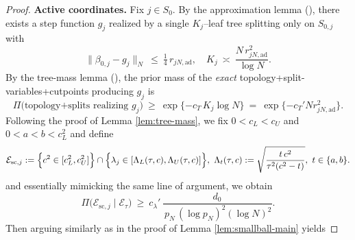\documentclass[11pt]{article}
\theoremstyle{plain}
\theoremstyle{definition}
\theoremstyle{plain}
\begin{document}
\begin{proof}
\medskip\noindent
\textbf{Active coordinates.}
Fix $j\in S_0$. By the approximation lemma (), there exists a step function $g_j$ realized by a single $K_j$–leaf tree splitting only on $S_{0,j}$ with
\begin{equation}\label{eq:approx-step}
\|\beta_{0,j}-g_j\|_N \ \le\ \tfrac14\,r_{jN,\mathrm{ad}},
\quad
K_j\ \asymp\ \frac{N\,r_{jN,\mathrm{ad}}^2}{\log N}.
\end{equation}
By the tree-mass lemma (), the prior mass of the \emph{exact} topology+split-variables+cutpoints producing $g_j$ is
\begin{equation}\label{eq:tree-mass}
\Pi\bigl(\text{topology+splits realizing }g_j\bigr)\ \ge\ \exp\{-c_T\,K_j\log N\}\ =\ \exp\{-c_T' N r_{jN,\mathrm{ad}}^2\}.
\end{equation}
Following the proof of Lemma \ref{lem:tree-mass}, we fix $0<c_L<c_U$ and $0<a<b<c_L^2$ and define
\[
\mathcal E_{\mathrm{sc},j}:=\Bigl\{c^2\in[c_L^2,c_U^2]\Bigr\}\cap \Bigl\{\lambda_j\in[\Lambda_L(\tau,c),\Lambda_U(\tau,c)]\Bigr\},
\
\Lambda_t(\tau,c):=\sqrt{\frac{t\,c^2}{\tau^2(c^2-t)}},\ t\in\{a,b\}.
\]
and essentially mimicking the same line of argument, we obtain
\begin{equation}\label{eq:calib-mass-dp-new}
\Pi\bigl(\mathcal E_{\mathrm{sc},j}\mid \mathcal E_\tau\bigr)
\ \ge\ c_\lambda'\,\frac{d_0}{\,p_N\,(\log p_N)^2(\log N)^2}.
\end{equation}
Then arguing similarly as in the proof of Lemma \ref{lem:smallball-main} yields

\end{proof}
\end{document}
